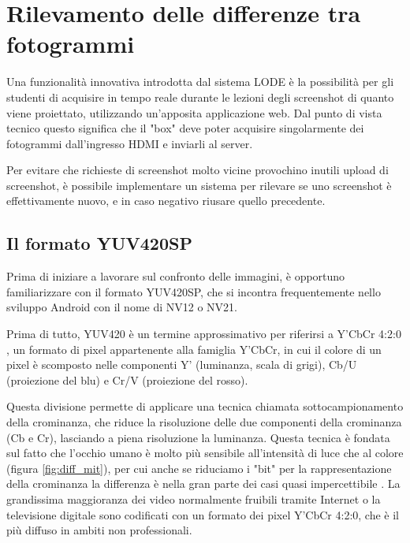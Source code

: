 \chapter{Rilevamento delle differenze tra fotogrammi}
\label{cha:diff}

Una funzionalità innovativa introdotta dal sistema LODE è la possibilità per gli studenti di acquisire in tempo reale durante le lezioni degli screenshot di quanto viene proiettato, utilizzando un'apposita applicazione web. Dal punto di vista tecnico questo significa che il "box" deve poter acquisire singolarmente dei fotogrammi dall'ingresso HDMI e inviarli al server.

Per evitare che richieste di screenshot molto vicine provochino inutili upload di screenshot, è possibile implementare un sistema per rilevare se uno screenshot è effettivamente nuovo, e in caso negativo riusare quello precedente.

\section{Il formato YUV420SP}
\label{sec:diff_yuv}

Prima di iniziare a lavorare sul confronto delle immagini, è opportuno familiarizzare con il formato YUV420SP, che si incontra frequentemente nello sviluppo Android con il nome di NV12 o NV21.

Prima di tutto, YUV420 è un termine approssimativo per riferirsi a Y'CbCr 4:2:0 \cite{yuv}, un formato di pixel appartenente alla famiglia Y'CbCr, in cui il colore di un pixel è scomposto nelle componenti Y' (luminanza, scala di grigi\footnotemark{}), Cb/U (proiezione del blu) e Cr/V (proiezione del rosso).


Questa divisione permette di applicare una tecnica chiamata sottocampionamento della crominanza, che riduce la risoluzione delle due componenti della crominanza (Cb e Cr), lasciando a piena risoluzione la luminanza. Questa tecnica è fondata sul fatto che l'occhio umano è molto più sensibile all'intensità di luce che al colore (figura \ref{fig:diff_mit}), per cui anche se riduciamo i "bit" per la rappresentazione della crominanza la differenza è nella gran parte dei casi quasi impercettibile \cite{luminance}. La grandissima maggioranza dei video normalmente fruibili tramite Internet o la televisione digitale sono codificati con un formato dei pixel Y'CbCr 4:2:0, che è il più diffuso in ambiti non professionali.

